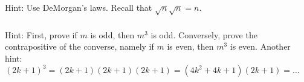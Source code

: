 \subsubsection*{ \answers}
Hint: Use DeMorgan's laws.  Recall that $\sqrt{n}\sqrt{n} = n$.

\subsubsection*{ \answers}
Hint: First, prove if $m$ is odd, then $m^3$ is odd. Conversely, prove the contrapositive of the converse, namely if $m$ is even, then $m^3$ is even.  Another hint: $(2k+1)^3 = (2k+1)(2k+1)(2k+1) = (4k^2+4k+1)(2k+1)=\ldots$












